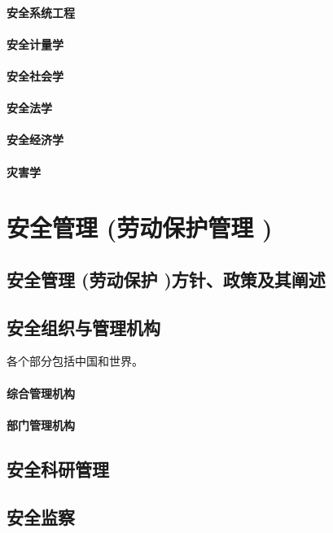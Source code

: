 \documentclass[UTF8]{../ApplicationUniverse}
\begin{document}
    \subsubsection{安全系统工程}
    \subsubsection{安全计量学}
    \subsubsection{安全社会学}
    \subsubsection{安全法学}
    \subsubsection{安全经济学}
    \subsubsection{灾害学}





\chapter{安全管理 (劳动保护管理 )}
\section{安全管理 (劳动保护 )方针、政策及其阐述}
\section{安全组织与管理机构}
各个部分包括中国和世界。
    \subsubsection{综合管理机构}
    \subsubsection{部门管理机构}
\section{安全科研管理}
\section{安全监察}
\end{document}
